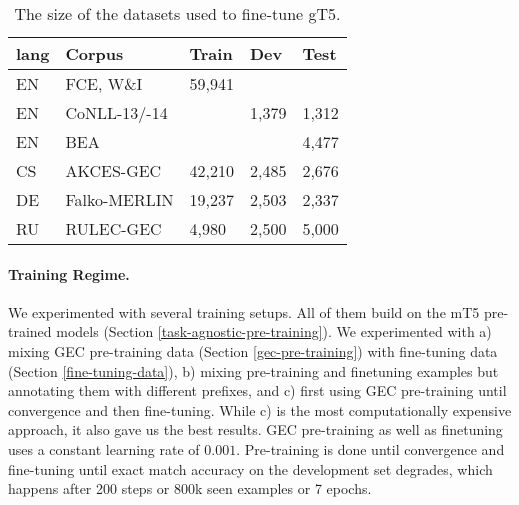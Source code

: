 \documentclass[11pt,a4paper]{article}
\newcommand{\GT}[0]{{gT5}\xspace}
\begin{document}
\begin{table}[h]
\footnotesize
\begin{tabularx}{\columnwidth}{lXlll}
\toprule 
lang & Corpus & Train & Dev & Test \\ \midrule 
EN   & FCE, W\&I    & 59,941 &  &  \\
EN   & CoNLL-13/-14 &        & 1,379 & 1,312 \\
EN   & BEA          &        &       & 4,477 \\
CS   & AKCES-GEC    & 42,210 & 2,485 & 2,676       \\
DE   & Falko-MERLIN & 19,237 & 2,503 & 2,337       \\
RU   & RULEC-GEC    &  4,980 & 2,500 & 5,000       \\
\bottomrule 
\end{tabularx}
\caption{The size of the datasets used to fine-tune \GT.}
\label{tbl:dataset}
\end{table}

\paragraph*{Training Regime.}
We experimented with several training setups. All of them build on the mT5 pre-trained models (Section \ref{task-agnostic-pre-training}). We experimented with
a) mixing GEC pre-training data (Section \ref{gec-pre-training}) with fine-tuning data (Section \ref{fine-tuning-data}),
b) mixing pre-training and finetuning examples but annotating them with different prefixes, and
c) first using GEC pre-training until convergence and then fine-tuning.
While c) is the most computationally expensive approach, it also gave us the best results.
GEC pre-training as well as finetuning uses a constant learning rate of $0.001$.
Pre-training is done until convergence and fine-tuning until exact match accuracy on the development set degrades, which happens after 200 steps or 800k seen examples or 7 epochs.
\end{document}
